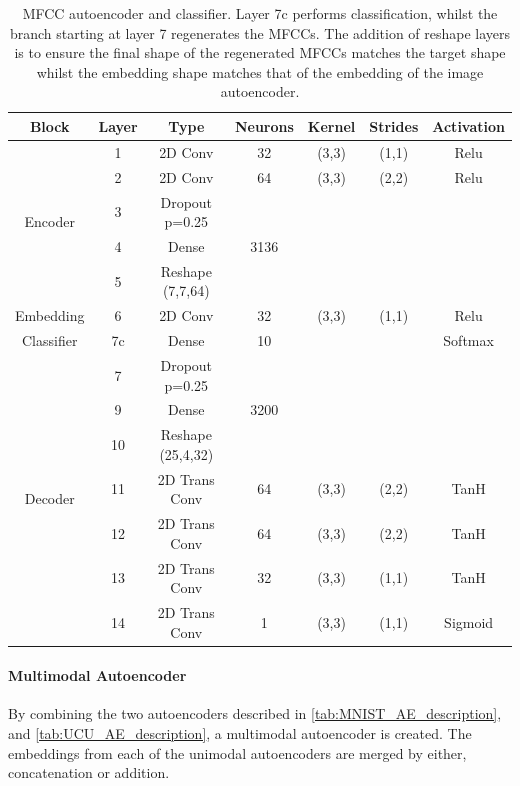 	\begin{table}[t]
		\centering
		\begin{tabular}{|c|c|c|c|c|c|c|}
			\hline
			Block & Layer & Type & Neurons & Kernel & Strides & Activation  \\ \hline
			\multirow{5}{*}{Encoder} & 1	&	2D Conv & 32 & (3,3) & (1,1)  & Relu\\ \cline{2-7}
			& 2	&	2D Conv & 64 & (3,3) & (2,2)  & Relu\\ \cline{2-7}
			& 3 	&	Dropout p=0.25 &	 & 	     &        & \\ \cline{2-7}
			& 4	&	Dense          & 3136 & 	 &        & \\ \cline{2-7}
			& 5   &	Reshape (7,7,64) &    &     &        & \\ \hline
			Embedding & 6	&	2D Conv & 32 & (3,3) & (1,1)  & Relu  \\ \hline
			Classifier & 7c	&	Dense          & 10 &       &        & Softmax \\ \hline
			\multirow{7}{*}{Decoder} & 7 	&	Dropout p=0.25 &	 & 	     &        & \\ \cline{2-7}
			& 9	&	Dense			& 3200 &     &        & \\ \cline{2-7}
			& 10	&	Reshape (25,4,32) &    &    &        & \\ \cline{2-7}
			& 11	&	2D Trans Conv & 64 & (3,3) & (2,2)  & TanH \\ \cline{2-7}
			& 12	&	2D Trans Conv & 64 & (3,3) & (2,2)  & TanH \\ \cline{2-7}
			& 13	&	2D Trans Conv & 32 & (3,3) & (1,1)  & TanH \\ \cline{2-7}
			& 14	&	2D Trans Conv & 1 & (3,3) & (1,1) & Sigmoid \\ \hline
		\end{tabular}
		\caption{MFCC autoencoder and classifier. Layer 7c performs classification, whilst the branch starting at layer 7 regenerates the MFCCs. The addition of reshape layers is to ensure the final shape of the regenerated MFCCs matches the target shape whilst the embedding shape matches that of the embedding of the image autoencoder.}
		\label{tab:UCU_AE_description}
	\end{table}

\paragraph{Multimodal Autoencoder}
By combining the two autoencoders described in \autoref{tab:MNIST_AE_description}, and \autoref{tab:UCU_AE_description}, a multimodal autoencoder is created. The embeddings from each of the unimodal autoencoders are merged by either, concatenation or addition.
 

